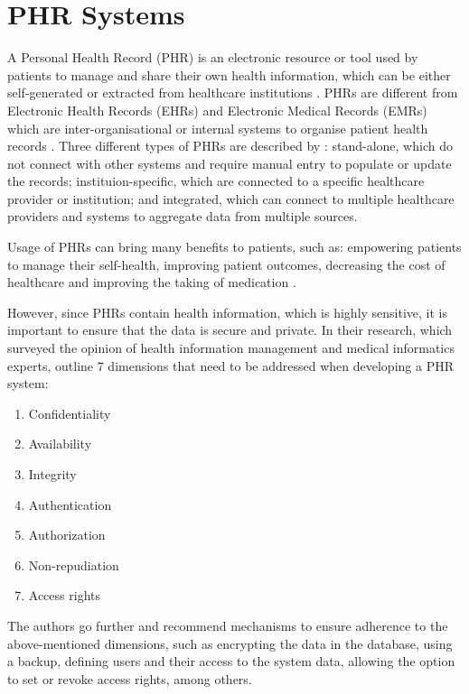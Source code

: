\section{PHR Systems}

A Personal Health Record (PHR) is an electronic resource or tool used by patients to manage and share their own health information, which can be either self-generated or extracted from healthcare institutions \parencite{phrsecurity,phrlist}. PHRs are different from Electronic Health Records (EHRs) and Electronic Medical Records (EMRs) which are inter-organisational or internal systems to organise patient health records \parencite{phrdiff,phrlist}. Three different types of PHRs are described by \textcite{phrsecurity}: stand-alone, which do not connect with other systems and require manual entry to populate or update the records; instituion-specific, which are connected to a specific healthcare provider or institution; and integrated, which can connect to multiple healthcare providers and systems to aggregate data from multiple sources. 

Usage of PHRs can bring many benefits to patients, such as: empowering patients to manage their self-health, improving patient outcomes, decreasing the cost of healthcare and improving the taking of medication \parencite{phrsecurity}.

However, since PHRs contain health information, which is highly sensitive, it is important to ensure that the data is secure and private. In their research, which surveyed the opinion of health information management and medical informatics experts, \textcite{phrsecurity} outline 7 dimensions that need to be addressed when developing a PHR system:
\begin{enumerate}
    \item Confidentiality
    \item Availability
    \item Integrity
    \item Authentication
    \item Authorization
    \item Non-repudiation
    \item Access rights
\end{enumerate}

The authors go further and recommend mechanisms to ensure adherence to the above-mentioned dimensions, such as encrypting the data in the database, using a backup, defining users and their access to the system data, allowing the option to set or revoke access rights, among others.


